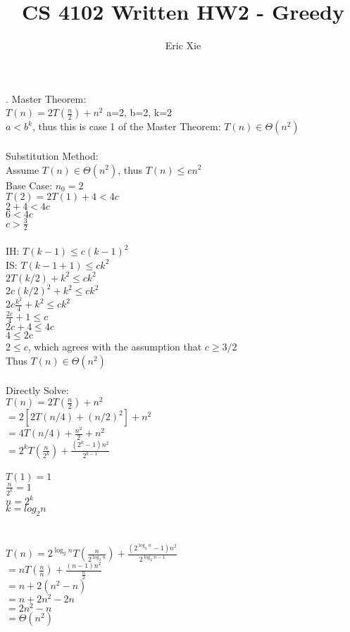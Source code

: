 \documentclass[a4paper,12pt]{article}
\title{CS 4102 Written HW2 - Greedy}
\author{Eric Xie}
\begin{document}
\maketitle
{}. Master Theorem:\\
$T(n)=2T\left(\frac{n}{2}\right)+n^2$
a=2, b=2, k=2 \\
$a<b^k$, thus this is case 1 of the Master Theorem: $T(n)\in\Theta(n^2)$\\\\
Substitution Method: \\
Assume $T(n)\in\Theta(n^2)$, thus $T(n)\leq cn^2$ \\
Base Case: $n_0=2$\\
$T(2)=2T(1)+4<4c$\\
$2+4<4c$\\
$6<4c$\\
$c>\frac{3}{2}$\\\\
IH: $T(k-1)\leq c(k-1)^2$\\
IS: $T(k-1+1)\leq ck^2$\\
$2T(k/2)+k^2 \leq ck^2$\\
$2c(k/2)^2+k^2 \leq ck^2$\\
$2c\frac{k^2}{4}+k^2\leq ck^2$\\
$\frac{2c}{4}+1\leq c$\\
$2c+4\leq 4c$\\
$4\leq 2c$\\
$2\leq c$, which agrees with the assumption that $c\geq3/2$\\
Thus $T(n)\in\Theta(n^2)$
\\\\
Directly Solve:\\
$T(n)=2T\left(\frac{n}{2}\right)+n^2$\\
$=2[2T(n/4)+(n/2)^2]+n^2$ \\
$=4T(n/4)+\frac{n^2}{2}+n^2$\\
$=2^kT(\frac{n}{2^k})+\frac{(2^k-1)n^2}{2^{k-1}}$\\\\
$T(1)=1$\\
$\frac{n}{2^k}=1$\\
$n=2^k$\\
$k=log_2{n}$\\\\\\

$T(n)=2^{\log_2n}T(\frac{n}{2^{\log_2n}})+\frac{(2^{\log_2n}-1)n^2}{2^{\log_2n-1}}$\\
$=nT(\frac{n}{n})+\frac{(n-1)n^2}{\frac{n}{2}}$\\
$=n+2(n^2-n)$\\
$=n+2n^2-2n$\\
$=2n^2-n$\\
$=\Theta(n^2)$\\
\end{document}
